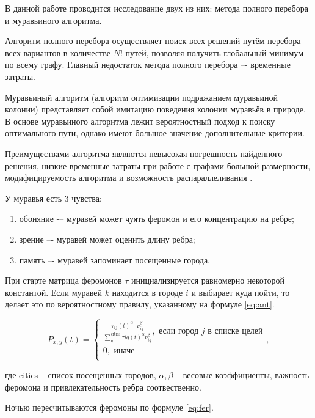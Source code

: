 \documentclass[a4paper,12pt]{article}
\begin{document}
В данной работе проводится исследование двух из них: метода полного перебора и муравьиного алгоритма.

Алгоритм полного перебора осуществляет поиск всех решений путём перебора всех вариантов в количестве $N!$
путей, позволяя получить глобальный минимум по всему графу. Главный недостаток метода полного перебора –- временные затраты.

Муравьиный алгоритм (алгоритм оптимизации подражанием муравьиной колонии) представляет собой имитацию поведения колонии
муравьёв в природе. В основе муравьиного алгоритма лежит вероятностный подход к поиску оптимального пути, однако имеют
большое значение дополнительные критерии.

Преимуществами алгоритма являются невысокая погрешность найденного решения, низкие временные затраты при работе
с графами большой размерности, модифицируемость алгоритма и возможность распараллеливания \cite{ant}.

У муравья есть 3 чувства:

\begin{enumerate}
    \item обоняние -– муравей может чуять феромон и его концентрацию на ребре;
    \item зрение –- муравей может оценить длину ребра;
    \item память –- муравей запоминает посещенные города.
\end{enumerate}

При старте матрица феромонов $\tau$ инициализируется равномерно некоторой константой.
Если муравей $k$ находится в городе $i$ и выбирает куда пойти, то делает это по вероятностному правилу, указанному
на формуле \ref{eq:ant}.

\begin{equation}\label{eq:ant}
    P_{x,y}(t) =
    \begin{cases}
        \frac{\tau_{ij}(t)^\alpha \cdot \nu_{ij}^\beta}{\sum_q^\text{cities} \tau{iq}(t)^\alpha \nu_{iq}^\beta},
        \text{ если город } j \text{ в списке целей} \\
        0, \text{ иначе} \\
    \end{cases},
\end{equation}

где cities -- список посещенных городов, $\alpha, \beta$ -- весовые коэффициенты,
важность феромона и привлекательность ребра соотвественно.

Ночью пересчитываются феромоны по формуле \ref{eq:fer}.
\end{document}
